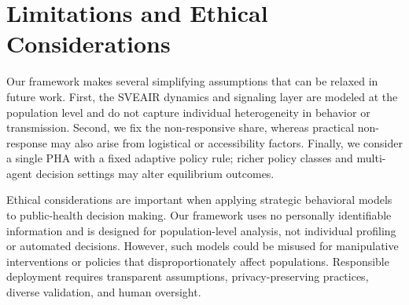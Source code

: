 \documentclass[sigconf,review]{acmart}
\begin{document}


\section*{Limitations and Ethical Considerations}

Our framework makes several simplifying assumptions that can be relaxed in future work. First, the SVEAIR dynamics and signaling layer are modeled at the population level and do not capture individual heterogeneity in behavior or transmission. Second, we fix the non-responsive share, whereas practical non-response may also arise from logistical or accessibility factors. Finally, we consider a single PHA with a fixed adaptive policy rule; richer policy classes and multi-agent decision settings may alter equilibrium outcomes.

Ethical considerations are important when applying strategic behavioral
models to public-health decision making. Our framework uses no personally
identifiable information and is designed for population-level analysis,
not individual profiling or automated decisions. However, such models
could be misused for manipulative interventions or policies that
disproportionately affect populations. Responsible deployment requires
transparent assumptions, privacy-preserving practices, diverse validation,
and human oversight.
\end{document}
